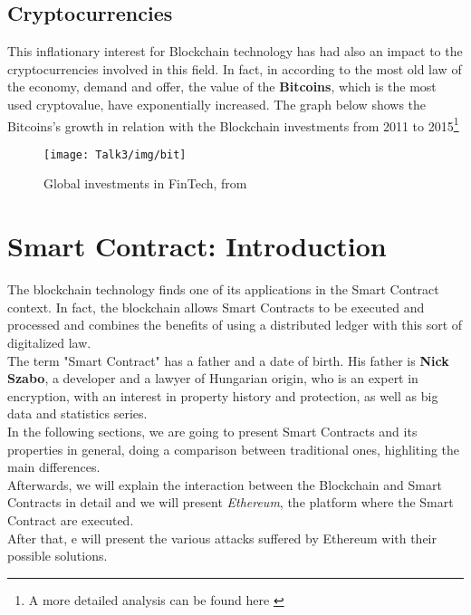 \subsection{Cryptocurrencies}
This inflationary interest for Blockchain technology has had also an impact to the cryptocurrencies involved in this field. In fact, in according to the most old law of the economy, demand and offer, the value of the \textbf{Bitcoins}, which is the most used cryptovalue, have exponentially increased.
The graph below shows the Bitcoins's growth in relation with the Blockchain investments from 2011 to 2015\footnote{A more detailed analysis can be found here \cite{aaa}} \\

           \begin{figure}[H]
         \begin{center}
         \texttt{[image: Talk3/img/bit]}
         \end{center}
         \caption{Global investments in FinTech, from \cite{aaa}}
         \label{label}
       \end{figure}





\section{Smart Contract: Introduction}
The blockchain technology finds one of its applications in the Smart Contract context. In fact, the blockchain allows Smart Contracts to be executed and processed and combines the benefits of using a distributed ledger with this sort of digitalized law. \\
The term "Smart Contract" has a father and a date of birth. His father is \textbf{Nick Szabo}, a developer and a lawyer of Hungarian origin, who is an expert in encryption, with an interest in property history and protection, as well as big data and statistics series. \\
In the following sections, we are going to present Smart Contracts and its properties in general, doing a comparison between traditional ones, highliting the main differences. \\ Afterwards, we will explain the interaction between the Blockchain and Smart Contracts in detail and we will present \textit{Ethereum}, the platform where the Smart Contract are executed. \\
After that, e will present the various attacks suffered by Ethereum with their possible solutions.


